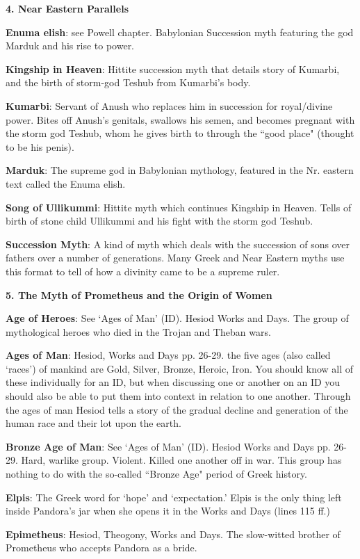 \documentclass{scrartcl}
\begin{document}
\begin{multicols*}{3}
{\bf 4. Near Eastern Parallels}

{\bf Enuma elish}: see Powell chapter. Babylonian Succession myth featuring the god Marduk and his rise to power.

{\bf Kingship in Heaven}: Hittite succession myth that details story of Kumarbi, and the birth of storm-god Teshub from Kumarbi's body.

{\bf Kumarbi}: Servant of Anush who replaces him in succession for royal/divine power. Bites off Anush's genitals, swallows his semen, and becomes pregnant with the storm god Teshub, whom he gives birth to through the ``good place" (thought to be his penis).

{\bf Marduk}: The supreme god in Babylonian mythology, featured in the Nr. eastern text called the Enuma elish.

{\bf Song of Ullikummi}: Hittite myth which continues Kingship in Heaven. Tells of birth of stone child Ullikummi and his fight with the storm god Teshub.

{\bf Succession Myth}: A kind of myth which deals with the succession of sons over fathers over a number of generations. Many Greek and Near Eastern myths use this format to tell of how a divinity came to be a supreme ruler.


{\bf 5. The Myth of Prometheus and the Origin of Women}

{\bf Age of Heroes}: See `Ages of Man' (ID). Hesiod Works and Days. 
The group of mythological heroes who died in the Trojan and Theban wars.

{\bf Ages of Man}: Hesiod, Works and Days pp. 26-29. the five ages (also called `races') of mankind are Gold, Silver, Bronze, Heroic, Iron. You should know all of these individually for an ID, but when discussing one or another on an ID you should also be able to put them into context in relation to one another. Through the ages of man Hesiod tells a story of the gradual decline and generation of the human race and their lot upon the earth.

{\bf Bronze Age of Man}: See `Ages of Man' (ID). Hesiod Works and Days pp. 26-29. Hard, warlike group. Violent. Killed one another off in war. This group has nothing to do with the so-called ``Bronze Age" period of Greek history.

{\bf Elpis}: The Greek word for `hope' and `expectation.' Elpis is the only thing left inside Pandora's jar when she opens it in the Works and Days (lines 115 ff.)

{\bf Epimetheus}: Hesiod, Theogony, Works and Days. The slow-witted brother of Prometheus who accepts Pandora as a bride.


\end{multicols*}
\end{document}
